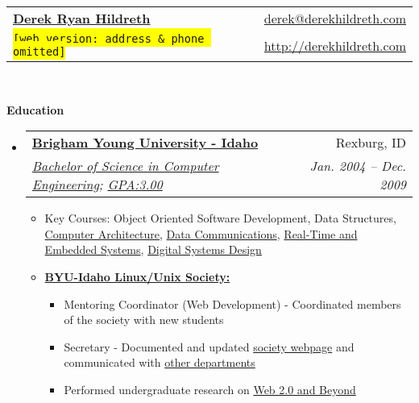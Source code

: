 \documentclass[letterpaper,11pt]{article}
\makeatletter
\newcommand{\resitem}[1]{\item #1 \vspace{-2pt}}
\newcommand{\resheading}[1]{{\large \colorbox{mygrey}{\begin{minipage}{\textwidth}{\textbf{#1 \vphantom{p\^{E}}}}\end{minipage}}}}
\newcommand{\ressubheading}[4]{
\begin{tabular*}{6.5in}{l@{\extracolsep{\fill}}r}
		\textbf{#1} & #2 \\
		\textit{#3} & \textit{#4} \\
\end{tabular*}\vspace{-6pt}}
\makeatother
\begin{document}
\newcommand{\mywebheader}{
\begin{tabular*}{7in}{l@{\extracolsep{\fill}}r}
	\textbf{\href{http://www.derekhildreth.com/}{\LARGE Derek Ryan Hildreth}} & \href{mailto:derek@derekhildreth.com}{derek@derekhildreth.com}\\
	{\footnotesize \texttt{\colorbox{yellow}{[web version:  address \& phone omitted]}}} & \href{http://www.derekhildreth.com}{http://derekhildreth.com} \\
	\end{tabular*}
\\
\vspace{0.1in}}

\mywebheader

\resheading{Education}
	\begin{itemize}
		\item
			\ressubheading{\href{http://www.byui.edu}{Brigham Young University - Idaho}}{Rexburg, ID}{\href{http://www.byui.edu/csee/compe/default.htm}{Bachelor of Science in Computer Engineering}; \href{http://www.derekhildreth.com/portfolio/unofficial_transcript.pdf}{GPA:3.00}}{Jan. 2004 -- Dec. 2009}
				{ \footnotesize
				\begin{itemize}
					\resitem{Key Courses: Object Oriented Software Development, Data Structures, \href{http://derekhildreth.com/portfolio/Resume/catalog/class.asp1045.htm}{Computer Architecture}, \href{http://derekhildreth.com/portfolio/Resume/catalog/class.asp1073.htm}{Data Communications}, \href{http://derekhildreth.com/portfolio/Resume/catalog/class.asp1072.htm}{Real-Time and Embedded Systems}, \href{http://derekhildreth.com/portfolio/Resume/catalog/class.asp1069.htm}{Digital Systems Design}}
					\resitem{\textbf{\href{http://www.byui.edu/Societies/Linux/}{BYU-Idaho Linux/Unix Society:}}} 
						\begin{itemize}
							\resitem{Mentoring Coordinator (Web Development) - Coordinated members of the society with new students}
							\resitem{Secretary - Documented and updated \href{http://www.byui.edu/Societies/Linux/default.htm}{society webpage} and communicated with \href{http://www.byui.edu/BusandComm/}{other departments}} 
							\resitem{Performed undergraduate research on \href{http://www.derekhildreth.com/portfolio/Research/Web_2.0_and_Beyond_Report_Column_Format.pdf}{Web 2.0 and Beyond}}
						\end{itemize}
				\end{itemize}
}
\end{itemize}
\end{document}
